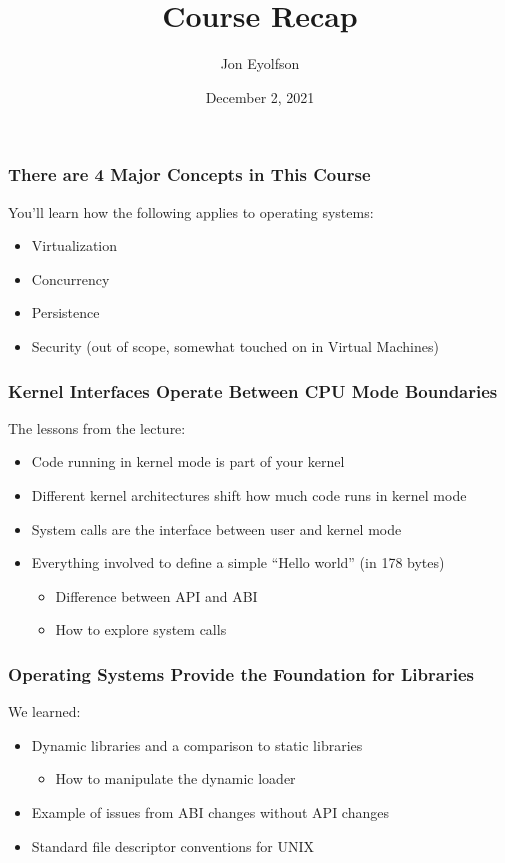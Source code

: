 

\title{Course Recap}
\author{Jon Eyolfson}
\date{December 2, 2021}


  \begin{frame}
    \titlepage
  \end{frame}

  \begin{frame}
    \frametitle{There are 4 Major Concepts in This Course}

    You'll learn how the following applies to operating systems:

    \begin{itemize}
      \item Virtualization
      \item Concurrency
      \item Persistence
      \item Security (out of scope, somewhat touched on in Virtual Machines)
    \end{itemize}
  \end{frame}

  \begin{frame}
    \frametitle{Kernel Interfaces Operate Between CPU Mode Boundaries}

    The lessons from the lecture:
    \begin{itemize}
      \item Code running in kernel mode is part of your kernel
      \item Different kernel architectures shift how much code runs in kernel mode
      \item System calls are the interface between user and kernel mode
      \item Everything involved to define a simple ``Hello world'' (in 178 bytes)
      \begin{itemize}
        \item Difference between API and ABI
        \item How to explore system calls
      \end{itemize}
    \end{itemize}
  \end{frame}

  \begin{frame}
    \frametitle{Operating Systems Provide the Foundation for Libraries}

    We learned:
    \begin{itemize}
      \item Dynamic libraries and a comparison to static libraries
      \begin{itemize}
        \item How to manipulate the dynamic loader
      \end{itemize}
      \item Example of issues from ABI changes without API changes
      \item Standard file descriptor conventions for UNIX
    \end{itemize}
  \end{frame}

